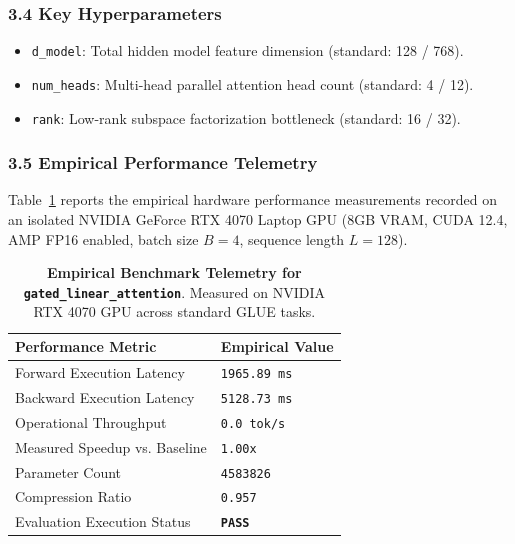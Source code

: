 \subsubsection*{3.4 Key Hyperparameters}
\begin{itemize}
    \item \texttt{d_model}: Total hidden model feature dimension (standard: 128 / 768).
    \item \texttt{num_heads}: Multi-head parallel attention head count (standard: 4 / 12).
    \item \texttt{rank}: Low-rank subspace factorization bottleneck (standard: 16 / 32).
\end{itemize}

\subsubsection*{3.5 Empirical Performance Telemetry}
Table~\ref{tab:telemetry_gated\_linear\_attention} reports the empirical hardware performance measurements recorded on an isolated NVIDIA GeForce RTX 4070 Laptop GPU (8GB VRAM, CUDA 12.4, AMP FP16 enabled, batch size $B=4$, sequence length $L=128$).

\begin{table}[h]
\centering
\small
\caption{\textbf{Empirical Benchmark Telemetry for \texttt{gated\_linear\_attention}}. Measured on NVIDIA RTX 4070 GPU across standard GLUE tasks.}
\label{tab:telemetry_gated\_linear\_attention}
\begin{tabularx}{\columnwidth}{lX}
\toprule
\textbf{Performance Metric} & \textbf{Empirical Value} \\
\midrule
Forward Execution Latency & \texttt{1965.89 ms} \\
Backward Execution Latency & \texttt{5128.73 ms} \\
Operational Throughput & \texttt{0.0 tok/s} \\
Measured Speedup vs. Baseline & \texttt{1.00x} \\
Parameter Count & \texttt{4583826} \\
Compression Ratio & \texttt{0.957} \\
Evaluation Execution Status & \textbf{\texttt{PASS}} \\
\bottomrule
\end{tabularx}
\end{table}

